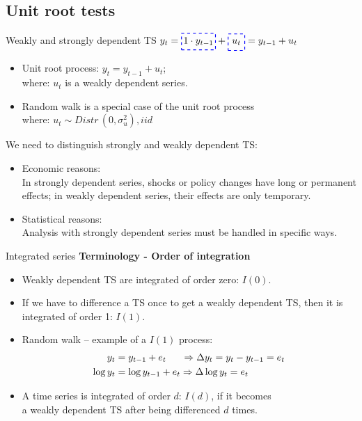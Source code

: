 \documentclass{beamer}
\newcommand*\boxedd[1]{\tikz[baseline=(char.base)]{
    \node[shape=rectangle, dashed, draw=blue, thick, inner sep=2pt, minimum size=0.6cm] (char) {#1};}}
\begin{document}
\subsection{Unit root tests}
\begin{frame}{Weakly and strongly dependent TS}
$y_t = \boxedd{$1 \cdot y_{t-1}$} + \boxedd{$u_t$} = y_{t-1} + u_t$
\medskip
\begin{itemize}
\item Unit root process: $y_t = y_{t-1} + u_t$; \quad  \\
where: $u_t$ is a weakly dependent series.
\item Random walk is a special case of the unit root process \\where: $u_t \sim \textit{Distr} \, (0, \sigma_u^2), \textit{iid}$
\bigskip
\end{itemize}
We need to distinguish strongly and weakly dependent TS:
\begin{itemize}
\item Economic reasons: \\ In strongly dependent series, shocks or policy changes  have  long or permanent effects; in weakly dependent series, their effects  are only temporary.
\item Statistical reasons: \\ Analysis with strongly dependent series must be handled in specific ways.
\end{itemize}
\end{frame}
\begin{frame}{Integrated series}
\textbf{Terminology - Order of integration }
\vspace{0.5cm}
\begin{itemize}
\item Weakly dependent TS are integrated of order zero: $I(0)$.
\vspace{0.2cm}
\item If we have to difference a TS once to get a weakly dependent TS, then it is integrated of order 1: $I(1)$.
\vspace{0.2cm}
\item Random walk -- example of a $I(1)$ process:
\begin{align}\nonumber
y_t & =y_{t-1}+e_t  \hspace{0.55cm} \Rightarrow \Delta y_t = y_t-y_{t-1}=e_t \\\nonumber
 \log{y_t} & =\log{y_{t-1}}+e_t  \Rightarrow \Delta \log{y_t}=e_t
 \end{align} 
 \item A time series is integrated of order $d$: $I(d)$, if it becomes \\a weakly dependent TS after being differenced $d$ times.
\end{itemize}
\end{frame}
\end{document}
